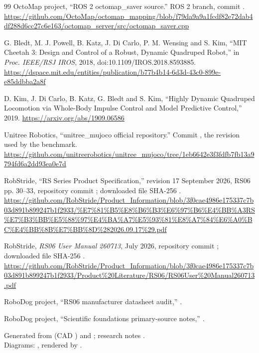 \documentclass[11pt,a4paper]{article}
\begin{document}
\begin{thebibliography}{99}
OctoMap project, ``ROS 2 octomap\_saver source.''
ROS 2 branch, commit .
\url{https://github.com/OctoMap/octomap_mapping/blob/f79da9a9a1fcdf82e72dab4df288d6cc27c6e163/octomap_server/src/octomap_saver.cpp}

G. Bledt, M. J. Powell, B. Katz, J. Di Carlo, P. M. Wensing and S. Kim,
``MIT Cheetah 3: Design and Control of a Robust, Dynamic Quadruped Robot,''
in \emph{Proc. IEEE/RSJ IROS}, 2018, doi:10.1109/IROS.2018.8593885.
\url{https://dspace.mit.edu/entities/publication/b77b4b14-6d3d-43c0-899e-e85ddbba2a8f}

D. Kim, J. Di Carlo, B. Katz, G. Bledt and S. Kim, ``Highly Dynamic Quadruped
Locomotion via Whole-Body Impulse Control and Model Predictive Control,'' 2019.
\url{https://arxiv.org/abs/1909.06586}

Unitree Robotics, ``unitree\_mujoco official repository.''
Commit , the revision used by the benchmark.
\url{https://github.com/unitreerobotics/unitree_mujoco/tree/1eb6642e3f3fdfb7fb13a9794fd6a2dd93ea0e7d}

RobStride, ``RS Series Product Specification,'' revision 17 September 2026,
RS06 pp. 30--33, repository commit ; downloaded file SHA-256
.
\url{https://github.com/RobStride/Product_Information/blob/3f0cae4986e175337c7b03d891b899247b1f2933/%E7%81%B5%E8%B6%B3%E6%97%B6%E4%BB%A3RS%E7%B3%BB%E5%88%97%E4%BA%A7%E5%93%81%E8%A7%84%E6%A0%BC%E4%BB%8B%E7%BB%8D%282026.09.17%29.pdf}

RobStride, \emph{RS06 User Manual 260713}, July 2026, repository commit
; downloaded file SHA-256
.
\url{https://github.com/RobStride/Product_Information/blob/3f0cae4986e175337c7b03d891b899247b1f2933/Product%20Literature/RS06/RS06User%20Manual260713.pdf}

RoboDog project, ``RS06 manufacturer datasheet audit,''
.

RoboDog project, ``Scientific foundations primary-source notes,''
.
\end{thebibliography}

\vspace{4mm}
\begin{center}\small\color{rdgrey}
Generated from  (CAD \texttt{\RdCadSha}) and
; research notes
.\\
Diagrams: , rendered by .
\end{center}
\end{document}
